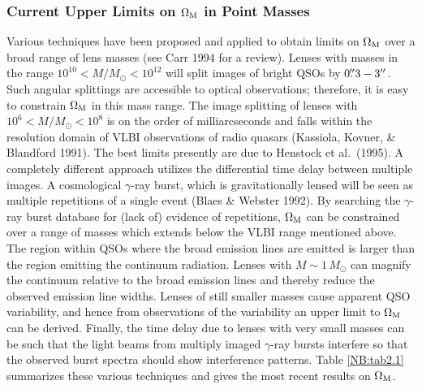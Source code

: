 \documentclass[a4paper,10pt]{article} %
\newcommand{\farcs}{\hbox{$.\!\!^{\prime\prime}$}}
\begin{document}
\subsubsection{Current Upper Limits on $\Omega_{\rm M}$ in Point
Masses}
\label{NB:subsubsect2.3.2}

Various techniques have been proposed and applied to obtain limits on
$\Omega_{\rm M}$ over a broad range of lens masses (see Carr 1994 for
a review). Lenses with masses in the range $10^{10}<M/M_\odot<10^{12}$
will split images of bright QSOs by $0\farcs3-3''$. Such angular
splittings are accessible to optical observations; therefore, it is
easy to constrain $\Omega_{\rm M}$ in this mass range. The image
splitting of lenses with $10^6<M/M_\odot<10^8$ is on the order of
milliarcseconds and falls within the resolution domain of VLBI
observations of radio quasars (Kassiola, Kovner, \& Blandford
1991). The best limits presently are due to Henstock et al.\ (1995). A
completely different approach utilizes the differential time delay
between multiple images. A cosmological $\gamma$-ray burst, which is
gravitationally lensed will be seen as multiple repetitions of a
single event (Blaes \& Webster 1992). By searching the $\gamma$-ray
burst database for (lack of) evidence of repetitions, $\Omega_{\rm M}$
can be constrained over a range of masses which extends below the VLBI
range mentioned above. The region within QSOs where the broad emission
lines are emitted is larger than the region emitting the continuum
radiation. Lenses with $M\sim1\,M_\odot$ can magnify the continuum
relative to the broad emission lines and thereby reduce the observed
emission line widths. Lenses of still smaller masses cause apparent
QSO variability, and hence from observations of the variability an
upper limit to $\Omega_{\rm M}$ can be derived. Finally, the time
delay due to lenses with very small masses can be such that the light
beams from multiply imaged $\gamma$-ray bursts interfere so that the
observed burst spectra should show interference patterns. Table
\ref{NB:tab2.1} summarizes these various techniques and gives the most
recent results on $\Omega_{\rm M}$.
\end{document}
